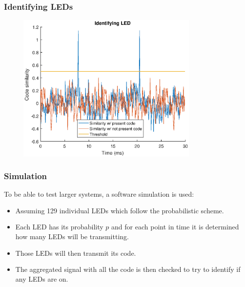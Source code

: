 \documentclass{beamer}
\begin{document}
	\begin{frame}\frametitle{Identifying LEDs}

		\begin{figure}
			\centering
			\includegraphics[width=0.8\textwidth]{correlation-results.eps}
		\end{figure}

	\end{frame}











	\begin{frame}\frametitle{Simulation}
		
		To be able to test larger systems, a software simulation is used: 

		\begin{itemize}

			\item Assuming 129 individual LEDs which follow the probabilistic scheme.

			\item Each LED has its probability $p$ and for each point in time it is determined how many LEDs will be transmitting.

			\item Those LEDs will then transmit its code.

			\item The aggregated signal with all the code is then checked to try to identify if any LEDs are on.
		\end{itemize}

		

	\end{frame}
\end{document}
